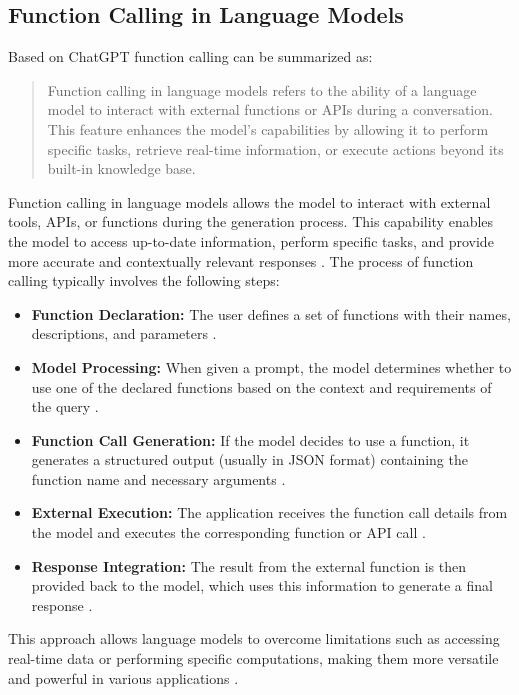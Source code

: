 \newpage
\subsection{Function Calling in Language Models}
Based on ChatGPT \cite{openai2024function-chatgpt} function calling can be summarized as:

\begin{quote}
Function calling in language models refers to the ability of a language model to interact with external functions or APIs during a conversation. This feature enhances the model's capabilities by allowing it to perform specific tasks, retrieve real-time information, or execute actions beyond its built-in knowledge base.
\end{quote} 

\noindent
Function calling in language models allows the model to interact with external tools, APIs, or functions during the generation process. This capability enables the model to access up-to-date information, perform specific tasks, and provide more accurate and contextually relevant responses \cite{mistral2024function, openai2024function-article, google2024function}.
The process of function calling typically involves the following steps:

\begin{itemize}
\item \textbf{Function Declaration:} The user defines a set of functions with their names, descriptions, and parameters \cite{mistral2024function}.

\item \textbf{Model Processing:} When given a prompt, the model determines whether to use one of the declared functions based on the context and requirements of the query \cite{mistral2024function, openai2024function-article}.

\item \textbf{Function Call Generation:} If the model decides to use a function, it generates a structured output (usually in JSON format) containing the function name and necessary arguments \cite{mistral2024function, openai2024function-article}.

\item \textbf{External Execution:} The application receives the function call details from the model and executes the corresponding function or API call \cite{mistral2024function, google2024function}.

\item \textbf{Response Integration:} The result from the external function is then provided back to the model, which uses this information to generate a final response \cite{mistral2024function, google2024function}.
\end{itemize}
This approach allows language models to overcome limitations such as accessing real-time data or performing specific computations, making them more versatile and powerful in various applications \cite{google2024function}.

